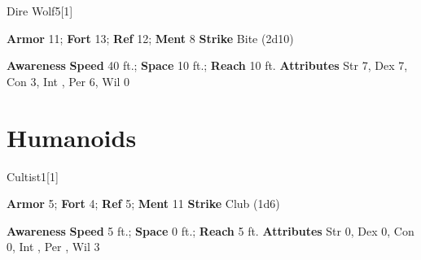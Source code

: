 \begin{monsection}{Dire Wolf}{5}[1]
\vspace{-1em}\vspace{-1em}
\begin{spellcontent}
\begin{spelltargetinginfo}
\pari \textbf{Armor} 11; \textbf{Fort} 13; \textbf{Ref} 12; \textbf{Ment} 8
\pari \textbf{Strike} Bite  (2d10)
\end{spelltargetinginfo}
\end{spellcontent}
\begin{spellsubcontent}
\begin{spellfooter}
\pari \textbf{Awareness} 
\pari \textbf{Speed} 40 ft.; \textbf{Space} 10 ft.; \textbf{Reach} 10 ft.
\pari \textbf{Attributes} Str 7, Dex 7, Con 3, Int , Per 6, Wil 0
\end{spellfooter}
\end{spellsubcontent}
\end{monsection}
\section{Humanoids}
\begin{monsection}{Cultist}{1}[1]
\vspace{-1em}\vspace{-1em}
\begin{spellcontent}
\begin{spelltargetinginfo}
\pari \textbf{Armor} 5; \textbf{Fort} 4; \textbf{Ref} 5; \textbf{Ment} 11
\pari \textbf{Strike} Club  (1d6)
\end{spelltargetinginfo}
\end{spellcontent}
\begin{spellsubcontent}
\begin{spellfooter}
\pari \textbf{Awareness} 
\pari \textbf{Speed} 5 ft.; \textbf{Space} 0 ft.; \textbf{Reach} 5 ft.
\pari \textbf{Attributes} Str 0, Dex 0, Con 0, Int , Per , Wil 3
\end{spellfooter}
\end{spellsubcontent}
\end{monsection}
